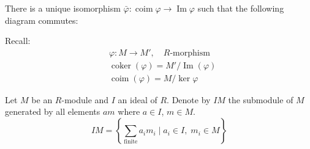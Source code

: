 \begin{proposition}
    There is a unique isomorphism $\bar{\varphi}: \operatorname{coim}\varphi \to \operatorname{Im}\varphi$ such that the following diagram commutes:
    \begin{center}
    \end{center}
    Recall:
    \[
        \begin{aligned}
             & \varphi: M \to M', \quad R\text{-morphism}                  \\
             & \operatorname{coker}(\varphi)=M'/\operatorname{Im}(\varphi) \\
             & \operatorname{coim}(\varphi)=M/\ker \varphi
        \end{aligned}
    \]
\end{proposition}

\begin{definition}
    Let $M$ be an $R$-module and $I$ an ideal of $R$. Denote by $IM$ the submodule of $M$ generated by all elements $am$ where $a \in I$, $m \in M$.
    \[
        IM = \left\{ \sum_{\text{finite}} a_{i} m_{i} \mid a_{i} \in I, \; m_{i} \in M \right\}
    \]
\end{definition}

